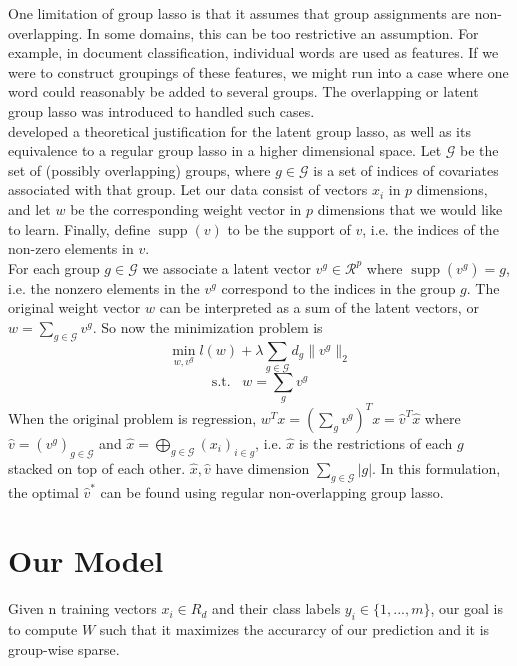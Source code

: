 \documentclass[11pt]{article}
\begin{document}
One limitation of group lasso is that it assumes that group assignments are
non-overlapping. In some domains, this can be too restrictive an assumption.
For example, in document classification, individual words are used as features.
If we were to construct groupings of these features, we might run into a case
where one word could reasonably be added to several groups. The overlapping or
latent group lasso was introduced to handled such cases.\\

\cite{obozinski2011group} developed a theoretical justification for the latent group lasso, as well
as its equivalence to a regular group lasso in a higher dimensional space.
Let $\mathcal{G}$ be the set of (possibly overlapping) groups,
where $g \in \mathcal{G}$ is a set of indices of covariates associated with 
that group. 
Let our
data consist of vectors $x_i$ in $p$ dimensions, and let $w$ be the 
corresponding weight vector in $p$ dimensions that we would like to learn.
Finally, define $\operatorname{supp}(v)$ to be the support of $v$, i.e.
the indices of the non-zero elements in $v$.\\

For each group
$g \in \mathcal{G}$ we associate a latent vector $v^g \in \mathcal{R}^p$ where
$\operatorname{supp}(v^g) = g$, i.e. the nonzero elements in the $v^g$ correspond
to the indices in the group $g$. 
The original weight vector $w$ can be
interpreted as a sum of the latent vectors, or
$w = \sum_{g \in \mathcal{G}} v^g$. 
So now the minimization problem is
$$ \min_{w, v^g} l(w) + \lambda \sum_{g \in \mathcal{G}} d_g \|v^g \|_2 $$
$$\mathrm{s.t.}\;\;\; w = \sum_g v^g$$ 
When the original problem is regression, 
$w^Tx = \left(\sum_g v^g\right)^Tx = \hat{v}^T \hat{x}$ where 
$\hat{v} = (v^{g})_{g \in \mathcal{G}}$ and
$\hat{x} = \bigoplus_{g \in \mathcal{G} } (x_i)_{i \in g}$, i.e. $\hat{x}$ is
the restrictions of each $g$ stacked on top of each other. $\hat{x}, \hat{v}$ 
have dimension $\sum_{g \in \mathcal{G}} |g|$.
In this formulation, the optimal $\hat{v}^*$ can be found using regular 
non-overlapping group lasso. 



\section{Our Model}

Given n training vectors $x_i \in R_d$ and their class labels $y_i \in \{1, ..., m\}$, our goal is to compute $W$ such that it maximizes the accurarcy of our prediction and it is group-wise sparse. \\
\end{document}
